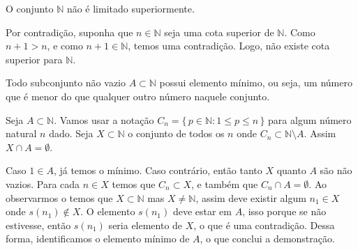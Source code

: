 \documentclass[../main.tex]{subfiles}
\begin{document}
\begin{teo}\label{nat-teo-ilimitadoSuperiormente}
    O conjunto $\mathbb{N}$ não é limitado superiormente.
\end{teo}
\begin{dem}
    Por contradição, suponha que $n \in \mathbb{N}$ seja uma cota superior de $\mathbb{N}$. Como $n+1 > n$, e como $n+1 \in \mathbb{N}$, temos uma contradição. Logo, não existe cota superior para $\mathbb{N}$.
\end{dem}
\begin{teo}\label{nat-teo-PBO}
    Todo subconjunto não vazio $A \subset \mathbb{N}$ possui elemento mínimo, ou seja, um número que é menor do que qualquer outro número naquele conjunto.
\end{teo}
\begin{dem}
    Seja $A \subset \mathbb{N}$. Vamos usar a notação $C_n = \{\,p \in \mathbb{N} : 1 \leq p \leq n \,\}$ para algum número natural $n$ dado. Seja $X \subset \mathbb{N}$ o conjunto de todos os $n$ onde $C_n \subset \mathbb{N} \setminus A$. Assim $X \cap A = \emptyset$.

    Caso $1 \in A$, já temos o mínimo. Caso contrário, então tanto $X$ quanto $A$ são não vazios. Para cada $n \in X$ temos que $C_n \subset X$, e também que $C_n \cap A = \emptyset$. Ao observarmos o  temos que $X \subset \mathbb{N}$ mas $X \neq \mathbb{N}$, assim deve existir algum $n_1 \in X$ onde $s(n_1) \not\in X$. O elemento $s(n_1)$ deve estar em $A$, isso porque se não estivesse, então $s(n_1)$ seria elemento de $X$, o que é uma contradição. Dessa forma, identificamos o elemento mínimo de $A$, o que conclui a demonstração.
\end{dem}
\end{document}

